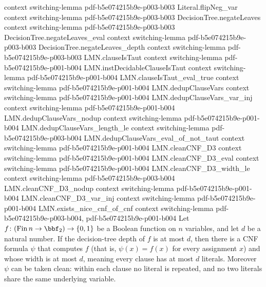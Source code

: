 \begin{theorem}
  {context}
  {switching-lemma}
  {pdf-b5e074215b9e-p003-b003}
\proofstep
  {Literal.flipNeg_var}
  {context}
  {switching-lemma}
  {pdf-b5e074215b9e-p003-b003}
\proofstep
  {DecisionTree.negateLeaves}
  {context}
  {switching-lemma}
  {pdf-b5e074215b9e-p003-b003}
\proofstep
  {DecisionTree.negateLeaves_eval}
  {context}
  {switching-lemma}
  {pdf-b5e074215b9e-p003-b003}
\proofstep
  {DecisionTree.negateLeaves_depth}
  {context}
  {switching-lemma}
  {pdf-b5e074215b9e-p003-b003}
\proofstep
  {LMN.clauseIsTaut}
  {context}
  {switching-lemma}
  {pdf-b5e074215b9e-p001-b004}
\proofstep
  {LMN.instDecidableClauseIsTaut}
  {context}
  {switching-lemma}
  {pdf-b5e074215b9e-p001-b004}
\proofstep
  {LMN.clauseIsTaut_eval_true}
  {context}
  {switching-lemma}
  {pdf-b5e074215b9e-p001-b004}
\proofstep
  {LMN.dedupClauseVars}
  {context}
  {switching-lemma}
  {pdf-b5e074215b9e-p001-b004}
\proofstep
  {LMN.dedupClauseVars_var_inj}
  {context}
  {switching-lemma}
  {pdf-b5e074215b9e-p001-b004}
\proofstep
  {LMN.dedupClauseVars_nodup}
  {context}
  {switching-lemma}
  {pdf-b5e074215b9e-p001-b004}
\proofstep
  {LMN.dedupClauseVars_length_le}
  {context}
  {switching-lemma}
  {pdf-b5e074215b9e-p003-b004}
\proofstep
  {LMN.dedupClauseVars_eval_of_not_taut}
  {context}
  {switching-lemma}
  {pdf-b5e074215b9e-p001-b004}
\proofstep
  {LMN.cleanCNF_D3}
  {context}
  {switching-lemma}
  {pdf-b5e074215b9e-p001-b004}
\proofstep
  {LMN.cleanCNF_D3_eval}
  {context}
  {switching-lemma}
  {pdf-b5e074215b9e-p001-b004}
\proofstep
  {LMN.cleanCNF_D3_width_le}
  {context}
  {switching-lemma}
  {pdf-b5e074215b9e-p003-b004}
\proofstep
  {LMN.cleanCNF_D3_nodup}
  {context}
  {switching-lemma}
  {pdf-b5e074215b9e-p001-b004}
\proofstep
  {LMN.cleanCNF_D3_var_inj}
  {context}
  {switching-lemma}
  {pdf-b5e074215b9e-p001-b004}
\proofstep
  {LMN.exists_nice_cnf_of_cnf}
  {context}
  {switching-lemma}
  {pdf-b5e074215b9e-p003-b004,
    pdf-b5e074215b9e-p001-b004}
Let $f\colon (\mathrm{Fin}\,n \to \bbf_2) \to \{0,1\}$ be a Boolean function on $n$
variables, and let $d$ be a natural number. If the decision-tree depth of $f$ is at most
$d$, then there is a CNF formula $\psi$ that computes $f$ (that is, $\psi(x) = f(x)$ for
every assignment $x$) and whose width is at most $d$, meaning every clause has at most
$d$ literals. Moreover $\psi$ can be taken clean: within each clause no literal is
repeated, and no two literals share the same underlying variable.
\end{theorem}

